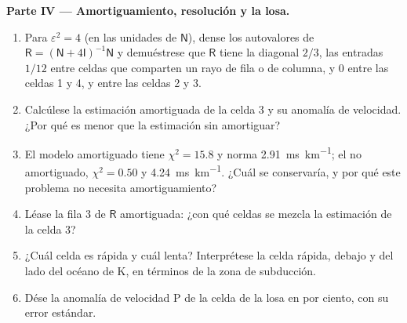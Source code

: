 \begin{problem}
\noindent\textbf{Parte IV --- Amortiguamiento, resolución y la losa.}
\begin{enumerate}[resume]
  \item Para $\varepsilon^2 = 4$ (en las unidades de $\mathsf N$), dense los
        autovalores de $\mathsf R = (\mathsf N + 4\mathsf I)^{-1}\mathsf N$ y
        demuéstrese que $\mathsf R$ tiene la diagonal $2/3$, las entradas $1/12$
        entre celdas que comparten un rayo de fila o de columna, y $0$ entre las celdas 1
        y 4, y entre las celdas 2 y 3.
  \item Calcúlese la estimación amortiguada de la celda 3 y su anomalía de velocidad. ¿Por qué es
        menor que la estimación sin amortiguar?
  \item El modelo amortiguado tiene $\chi^2 = 15.8$ y norma \qty{2.91}{ms.km^{-1}};
        el no amortiguado, $\chi^2 = 0.50$ y \qty{4.24}{ms.km^{-1}}. ¿Cuál se
        conservaría, y por qué este problema no necesita amortiguamiento?
  \item Léase la fila 3 de $\mathsf R$ amortiguada: ¿con qué celdas
        se mezcla la estimación de la celda 3?
  \item ¿Cuál celda es rápida y cuál lenta? Interprétese la celda rápida, debajo y
        del lado del océano de K, en términos de la zona de subducción.
  \item Dése la anomalía de velocidad P de la celda de la losa en por ciento, con su
        error estándar.
\end{enumerate}
\end{problem}
